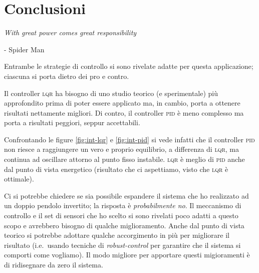 \section{Conclusioni}\label{sec:conclusioni}
\begin{framed}
  \begin{flushleft}
  \emph{With great power comes great responsibility}
  \end{flushleft}
  \begin{flushright}
    - Spider Man
  \end{flushright}
\end{framed}

Entrambe le strategie di controllo si sono rivelate adatte per questa applicazione;
ciascuna si porta dietro dei pro e contro.

Il controller \textsc{lqr} ha bisogno di uno studio teorico (e sperimentale) più approfondito prima di poter essere
applicato ma, in cambio, porta a ottenere risultati nettamente migliori.
Di contro, il controller \textsc{pid} è meno complesso ma porta a risultati peggiori, seppur accettabili.

Confrontando le figure \ref{fig:int-lqr} e \ref{fig:int-pid} si vede infatti che il controller \textsc{pid} non riesce
a raggiungere un vero e proprio equilibrio, a differenza di \textsc{lqr}, ma continua ad oscillare attorno al punto
fisso instabile.
\textsc{lqr} è meglio di \textsc{pid} anche dal punto di vista energetico (risultato che ci aspettiamo, visto che \textsc{lqr} è
ottimale).

Ci si potrebbe chiedere se sia possibile espandere il sistema che ho realizzato ad un doppio pendolo invertito;
la risposta è \emph{probabilmente no}.
Il meccanismo di controllo e il set di sensori che ho scelto si sono rivelati poco adatti a questo scopo e avrebbero
bisogno di qualche miglioramento.
Anche dal punto di vista teorico si potrebbe adottare qualche accorgimento in più per migliorare il risultato (i.e.\ usando
tecniche di \emph{robust-control} per garantire che il sistema si comporti come vogliamo).
Il modo migliore per apportare questi migioramenti è di ridisegnare da zero il sistema.
